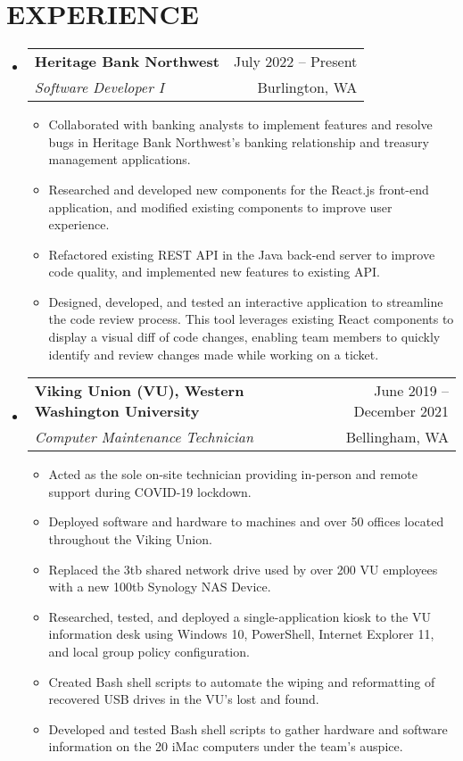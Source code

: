 \documentclass[letterpaper,11pt]{article}
\makeatletter
\newcommand{\resumeItem}[1]{
  \item\small{
    {#1 \vspace{-1pt}}
  }
}
\newcommand{\resumeSubheading}[4]{
  \vspace{-1pt}\item
    \begin{tabular*}{\textwidth}[t]{l@{\extracolsep{\fill}}r}
      \textbf{#1} & {\color{dark-grey}\small #2}\vspace{1pt}\\ %
      \textit{#3} & {\color{dark-grey} \small #4}\\ %
    \end{tabular*}\vspace{-4pt}
}
\newcommand{\resumeSubHeadingListStart}{\begin{itemize}[leftmargin=0in, label={}]}
\newcommand{\resumeSubHeadingListEnd}{\end{itemize}}
\newcommand{\resumeItemListStart}{\begin{itemize}}
\newcommand{\resumeItemListEnd}{\end{itemize}\vspace{0pt}}
\makeatother
\begin{document}
\section{EXPERIENCE}
  \resumeSubHeadingListStart

    \resumeSubheading
      {Heritage Bank Northwest}{July 2022 -- Present}
      {Software Developer I}{Burlington, WA}
     \resumeItemListStart
        \resumeItem{Collaborated with banking analysts to implement features and resolve bugs in Heritage Bank Northwest's banking relationship and treasury management applications.}
        \resumeItem{Researched and developed new components for the React.js front-end application, and modified existing components to improve user experience.}
        \resumeItem{Refactored existing REST API in the Java back-end server to improve code quality, and implemented new features to existing API.}
        \resumeItem{Designed, developed, and tested an interactive application to streamline the code review process. This tool leverages existing React components to display a visual diff of code changes, enabling team members to quickly identify and review changes made while working on a ticket.}
     \resumeItemListEnd

    \resumeSubheading
      {Viking Union (VU), Western Washington University}{June 2019 -- December 2021}
      {Computer Maintenance Technician}{Bellingham, WA}
      \resumeItemListStart
        \resumeItem{Acted as the sole on-site technician providing in-person and remote support during COVID-19 lockdown.}
        \resumeItem{Deployed software and hardware to machines and over 50 offices located throughout the Viking Union.}
        \resumeItem{Replaced the 3tb shared network drive used by over 200 VU employees with a new 100tb Synology NAS Device.}
        \resumeItem{Researched, tested, and deployed a single-application kiosk to the VU information desk using Windows 10, PowerShell, Internet Explorer 11, and local group policy configuration.}
        \resumeItem{Created Bash shell scripts to automate the wiping and reformatting of recovered USB drives in the VU’s lost and found.}
        \resumeItem{Developed and tested Bash shell scripts to gather hardware and software information on the 20 iMac computers under the team's auspice.}
      \resumeItemListEnd

  \resumeSubHeadingListEnd


\end{document}
